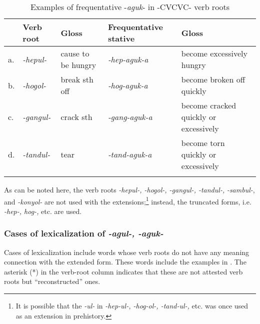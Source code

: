 \documentclass[output=paper		  ]{langscibook}
\begin{document}
\begin{table}[t]
\begin{tabularx}{\textwidth}{ll>{\raggedright\arraybackslash}p{}>{\raggedright\arraybackslash}p{}Q}

\lsptoprule
 & {Verb} {root} & {{{{Gloss}}}} & {Frequentative} {stative} & {{{{Gloss}}}}\\
 \midrule
 {a.}& {\textit{{}-hepul-}} & cause to be hungry & {\itshape {}-hep-aguk-a} & become excessively hungry\\
 {b.}& {\textit{{}-hogol-}} & { {break sth off}} & {\itshape {}-hog-aguk-a} & become broken off quickly\\
 {c.}& {\textit{{}-gangul-}} & crack sth & {\itshape {}-gang-aguk-a} & become cracked quickly or excessively\\
 {d.}& {\textit{{}-tandul-}} & { {tear}} & {\itshape {}-tand-aguk-a} & become torn quickly or excessively \\
\lspbottomrule
\end{tabularx}
\caption{Examples of frequentative -\textit{aguk}- in -CVCVC- verb roots}
\label{tabex:kahigi:31}
\end{table}

\begin{sloppypar}
As can be noted here, the verb roots \textit{-hepul-, -hogol-, -gangul-, -tandul-,} \mbox{\textit{-sambul-},} and {\textit{{}-konyol-}} {are not used with the extensions;}\footnote{ {It is possible that the} {\textit{{}-ul-} }{in} {\textit{{}-hep-ul-, -hog-ol-, -tand-ul-,}} {etc. was once used as an extension in prehistory.}} {instead, the truncated forms, i.e.} {\textit{{}-hep-, hog-,}} {etc. are used.} 
\end{sloppypar}

\subsubsection{Cases of lexicalization of \textit{{}-agul-, -aguk-}}\label{sec:kahigi:2.10.5}

Cases of lexicalization include words whose verb roots do not have any meaning connection with the extended form. These words include the examples in . {The asterisk (*) in the verb-root column indicates that these are not attested verb roots but ``reconstructed'' ones.}
\end{document}
